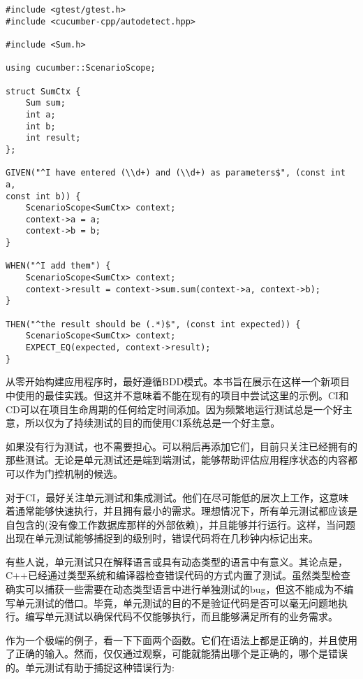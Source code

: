 \begin{lstlisting}[style=styleCXX]
#include <gtest/gtest.h>
#include <cucumber-cpp/autodetect.hpp>

#include <Sum.h>

using cucumber::ScenarioScope;

struct SumCtx {
	Sum sum;
	int a;
	int b;
	int result;
};

GIVEN("^I have entered (\\d+) and (\\d+) as parameters$", (const int a,
const int b)) {
	ScenarioScope<SumCtx> context;
	context->a = a;
	context->b = b;
}

WHEN("^I add them") {
	ScenarioScope<SumCtx> context;
	context->result = context->sum.sum(context->a, context->b);
}

THEN("^the result should be (.*)$", (const int expected)) {
	ScenarioScope<SumCtx> context;
	EXPECT_EQ(expected, context->result);
}
\end{lstlisting}

从零开始构建应用程序时，最好遵循BDD模式。本书旨在展示在这样一个新项目中使用的最佳实践。但这并不意味着不能在现有的项目中尝试这里的示例。CI和CD可以在项目生命周期的任何给定时间添加。因为频繁地运行测试总是一个好主意，所以仅为了持续测试的目的而使用CI系统总是一个好主意。

如果没有行为测试，也不需要担心。可以稍后再添加它们，目前只关注已经拥有的那些测试。无论是单元测试还是端到端测试，能够帮助评估应用程序状态的内容都可以作为门控机制的候选。


对于CI，最好关注单元测试和集成测试。他们在尽可能低的层次上工作，这意味着通常能够快速执行，并且拥有最小的需求。理想情况下，所有单元测试都应该是自包含的(没有像工作数据库那样的外部依赖)，并且能够并行运行。这样，当问题出现在单元测试能够捕捉到的级别时，错误代码将在几秒钟内标记出来。

有些人说，单元测试只在解释语言或具有动态类型的语言中有意义。其论点是，C++已经通过类型系统和编译器检查错误代码的方式内置了测试。虽然类型检查确实可以捕获一些需要在动态类型语言中进行单独测试的bug，但这不能成为不编写单元测试的借口。毕竟，单元测试的目的不是验证代码是否可以毫无问题地执行。编写单元测试以确保代码不仅能够执行，而且能够满足所有的业务需求。

作为一个极端的例子，看一下下面两个函数。它们在语法上都是正确的，并且使用了正确的输入。然而，仅仅通过观察，可能就能猜出哪个是正确的，哪个是错误的。单元测试有助于捕捉这种错误行为:


